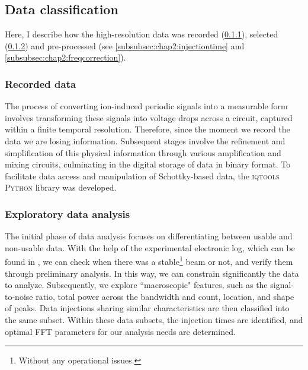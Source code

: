 \subsection{Data classification}\label{subsec:chap2:dataclassification}
Here, I describe how the high-resolution data was recorded (\cref{subsubsec:chap2:recorded}), selected (\cref{subsubsec:chap2:exploratory}) and pre-processed (see \cref{subsubsec:chap2:injectiontime} and \cref{subsubsec:chap2:freqcorrection}).
\subsubsection{Recorded data}\label{subsubsec:chap2:recorded}

The process of converting ion-induced periodic signals into a measurable form involves transforming these signals into voltage drops across a circuit, captured within a finite temporal resolution. Therefore, since the moment we record the data we are losing information. Subsequent stages involve the refinement and simplification of this physical information through various amplification and mixing circuits, culminating in the digital storage of data in binary format. To facilitate data access and manipulation of Schottky-based data, the \textsc{iqtools}~\cite{iqtools} \textsc{Python} library was developed.
\subsubsection{Exploratory data analysis}\label{subsubsec:chap2:exploratory}

The initial phase of data analysis focuses on differentiating between usable and non-usable data. With the help of the experimental electronic log, which can be found in \cite{e143elog}, we can check when there was a stable\footnote{Without any operational issues.} beam or not, and verify them through preliminary analysis. In this way, we can constrain significantly the data to analyze. Subsequently, we explore ``macroscopic" features, such as the signal-to-noise ratio, total power across the bandwidth and count, location, and shape of peaks. Data injections sharing similar characteristics are then classified into the same subset. Within these data subsets, the injection times are identified, and optimal \textsc{FFT} parameters for our analysis needs are determined.
